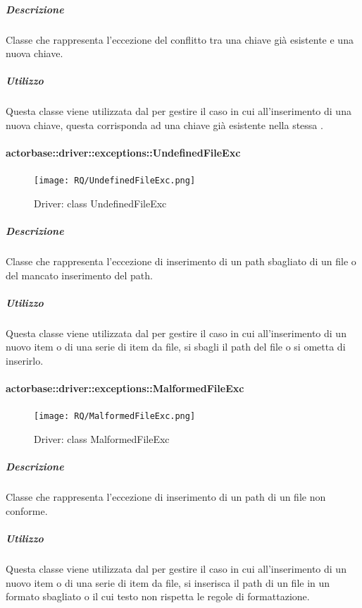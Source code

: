 \documentclass{scalatekids-article}
\begin{document}
\subparagraph{Descrizione}

Classe che rappresenta l'eccezione del conflitto tra una chiave già esistente e una nuova chiave.

\subparagraph{Utilizzo}

Questa classe viene utilizzata dal  per gestire il caso in cui all'inserimento di una nuova chiave, questa corrisponda ad una chiave già esistente nella stessa .

\paragraph{actorbase::driver::exceptions::UndefinedFileExc}

\begin{figure}[H]
  \begin{center}
    \texttt{[image: RQ/UndefinedFileExc.png]}
    \caption{Driver: class UndefinedFileExc}
  \end{center}
\end{figure}

\subparagraph{Descrizione}

Classe che rappresenta l'eccezione di inserimento di un path sbagliato di un file o del mancato inserimento del path.

\subparagraph{Utilizzo}

Questa classe viene utilizzata dal  per gestire il caso in cui all'inserimento di un nuovo item o di una serie di item da file, si sbagli il path del file o si ometta di inserirlo.

\paragraph{actorbase::driver::exceptions::MalformedFileExc}

\begin{figure}[H]
  \begin{center}
    \texttt{[image: RQ/MalformedFileExc.png]}
    \caption{Driver: class MalformedFileExc}
  \end{center}
\end{figure}

\subparagraph{Descrizione}

Classe che rappresenta l'eccezione di inserimento di un path di un file non conforme.

\subparagraph{Utilizzo}

Questa classe viene utilizzata dal  per gestire il caso in cui all'inserimento di un nuovo item o di una serie di item da file, si inserisca il path di un file in un formato sbagliato o il cui testo non rispetta le regole di formattazione.
\end{document}
